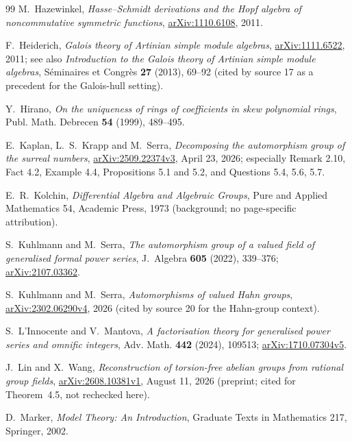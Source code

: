 \documentclass[11pt,oneside]{article}
\numberwithin{equation}{section}
\theoremstyle{definition}
\theoremstyle{remark}
\begin{document}
\begin{thebibliography}{99}
M.~Hazewinkel, \emph{Hasse--Schmidt derivations and the Hopf algebra of noncommutative symmetric functions},
\href{https://arxiv.org/abs/1110.6108}{arXiv:1110.6108}, 2011.

F.~Heiderich, \emph{Galois theory of Artinian simple module algebras},
\href{https://arxiv.org/abs/1111.6522}{arXiv:1111.6522}, 2011; see also \emph{Introduction to the Galois theory of Artinian
simple module algebras}, S\'eminaires et Congr\`es \textbf{27} (2013), 69--92 (cited by source 17 as a precedent for the
Galois-hull setting).

Y.~Hirano, \emph{On the uniqueness of rings of coefficients in skew polynomial rings},
Publ. Math. Debrecen \textbf{54} (1999), 489--495.

E.~Kaplan, L.~S.~Krapp and M.~Serra, \emph{Decomposing the automorphism group of the
surreal numbers}, \href{https://arxiv.org/abs/2509.22374v3}{arXiv:2509.22374v3}, April 23,
2026; especially Remark 2.10, Fact 4.2, Example 4.4, Propositions 5.1 and 5.2, and
Questions 5.4, 5.6, 5.7.

E.~R.~Kolchin, \emph{Differential Algebra and Algebraic Groups}, Pure and Applied Mathematics 54, Academic Press, 1973
(background; no page-specific attribution).

S.~Kuhlmann and M.~Serra, \emph{The automorphism group of a valued field of generalised
formal power series}, J.~Algebra \textbf{605} (2022), 339--376;
\href{https://arxiv.org/abs/2107.03362}{arXiv:2107.03362}.

S.~Kuhlmann and M.~Serra, \emph{Automorphisms of valued Hahn groups},
\href{https://arxiv.org/abs/2302.06290v4}{arXiv:2302.06290v4}, 2026 (cited by source 20 for the Hahn-group context).

S.~L'Innocente and V.~Mantova, \emph{A factorisation theory for generalised power
series and omnific integers}, Adv. Math. \textbf{442} (2024), 109513;
\href{https://arxiv.org/abs/1710.07304v5}{arXiv:1710.07304v5}.

J.~Lin and X.~Wang, \emph{Reconstruction of torsion-free abelian groups from rational group fields},
\href{https://arxiv.org/abs/2608.10381}{arXiv:2608.10381v1}, August 11, 2026 (preprint; cited for
Theorem~4.5, not rechecked here).

D.~Marker, \emph{Model Theory: An Introduction}, Graduate Texts in Mathematics 217,
Springer, 2002.


\end{thebibliography}
\end{document}
